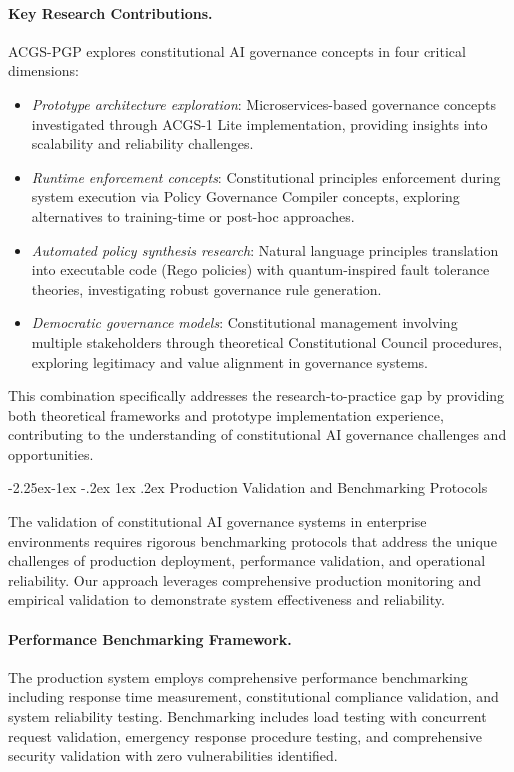 \documentclass[manuscript,screen,9pt]{acmart}
\makeatletter
\renewcommand\subsection{\@startsection{subsection}{2}{\z@}%
  {-2.25ex\@plus -1ex \@minus -.2ex}%
  {1ex \@plus .2ex}%
  {\normalfont\large\bfseries}}
\makeatother
\begin{document}
\paragraph{Key Research Contributions.} ACGS-PGP explores constitutional AI governance concepts in four critical dimensions:
\begin{itemize}[leftmargin=*,itemsep=1pt,parsep=1pt]
	\item \textit{Prototype architecture exploration}: Microservices-based governance concepts investigated through ACGS-1 Lite implementation, providing insights into scalability and reliability challenges.
	\item \textit{Runtime enforcement concepts}: Constitutional principles enforcement during system execution via Policy Governance Compiler concepts, exploring alternatives to training-time or post-hoc approaches.
	\item \textit{Automated policy synthesis research}: Natural language principles translation into executable code (Rego policies) with quantum-inspired fault tolerance theories, investigating robust governance rule generation.
	\item \textit{Democratic governance models}: Constitutional management involving multiple stakeholders through theoretical Constitutional Council procedures, exploring legitimacy and value alignment in governance systems.
\end{itemize}
This combination specifically addresses the research-to-practice gap by providing both theoretical frameworks and prototype implementation experience, contributing to the understanding of constitutional AI governance challenges and opportunities.

\subsection{Production Validation and Benchmarking Protocols}
\label{subsec:production_benchmarking}

The validation of constitutional AI governance systems in enterprise environments requires rigorous benchmarking protocols that address the unique challenges of production deployment, performance validation, and operational reliability. Our approach leverages comprehensive production monitoring and empirical validation to demonstrate system effectiveness and reliability.

\paragraph{Performance Benchmarking Framework.} The production system employs comprehensive performance benchmarking including response time measurement, constitutional compliance validation, and system reliability testing. Benchmarking includes load testing with concurrent request validation, emergency response procedure testing, and comprehensive security validation with zero vulnerabilities identified.
\end{document}
